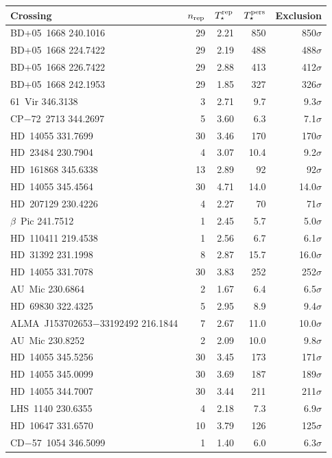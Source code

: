 \begin{tabular}{@{}l@{~~}r@{~~}r@{~~}r@{~~}r@{}}
\hline
Crossing & $n_{\rm rep}$ & $T_\star^{\rm rep}$ & $T_\star^{\rm pers}$ & Exclusion \\
\hline
BD+05~1668 240.1016 & 29 & 2.21 & 850 & 850$\sigma$ \\
BD+05~1668 224.7422 & 29 & 2.19 & 488 & 488$\sigma$ \\
BD+05~1668 226.7422 & 29 & 2.88 & 413 & 412$\sigma$ \\
BD+05~1668 242.1953 & 29 & 1.85 & 327 & 326$\sigma$ \\
61~Vir 346.3138 & 3 & 2.71 & 9.7 & 9.3$\sigma$ \\
CP$-$72~2713 344.2697 & 5 & 3.60 & 6.3 & 7.1$\sigma$ \\
HD~14055 331.7699 & 30 & 3.46 & 170 & 170$\sigma$ \\
HD~23484 230.7904 & 4 & 3.07 & 10.4 & 9.2$\sigma$ \\
HD~161868 345.6338 & 13 & 2.89 & 92 & 92$\sigma$ \\
HD~14055 345.4564 & 30 & 4.71 & 14.0 & 14.0$\sigma$ \\
HD~207129 230.4226 & 4 & 2.27 & 70 & 71$\sigma$ \\
$\beta$~Pic 241.7512 & 1 & 2.45 & 5.7 & 5.0$\sigma$ \\
HD~110411 219.4538 & 1 & 2.56 & 6.7 & 6.1$\sigma$ \\
HD~31392 231.1998 & 8 & 2.87 & 15.7 & 16.0$\sigma$ \\
HD~14055 331.7078 & 30 & 3.83 & 252 & 252$\sigma$ \\
AU~Mic 230.6864 & 2 & 1.67 & 6.4 & 6.5$\sigma$ \\
HD~69830 322.4325 & 5 & 2.95 & 8.9 & 9.4$\sigma$ \\
ALMA~J153702653$-$33192492 216.1844 & 7 & 2.67 & 11.0 & 10.0$\sigma$ \\
AU~Mic 230.8252 & 2 & 2.09 & 10.0 & 9.8$\sigma$ \\
HD~14055 345.5256 & 30 & 3.45 & 173 & 171$\sigma$ \\
HD~14055 345.0099 & 30 & 3.69 & 187 & 189$\sigma$ \\
HD~14055 344.7007 & 30 & 3.44 & 211 & 211$\sigma$ \\
LHS~1140 230.6355 & 4 & 2.18 & 7.3 & 6.9$\sigma$ \\
HD~10647 331.6570 & 10 & 3.79 & 126 & 125$\sigma$ \\
CD$-$57~1054 346.5099 & 1 & 1.40 & 6.0 & 6.3$\sigma$ \\

\end{tabular}
